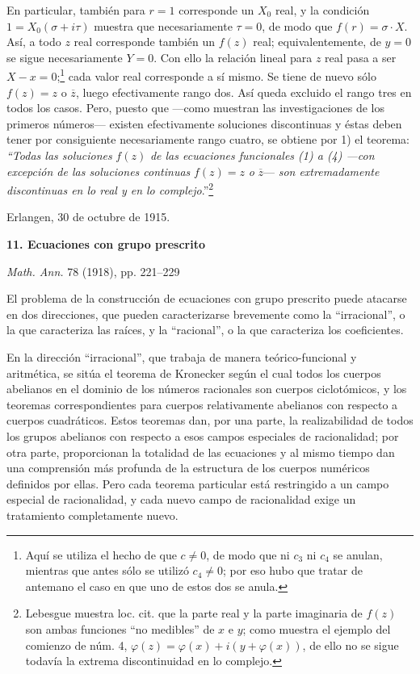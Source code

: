 \documentclass[11pt]{article}
\begin{document}
En particular, también para $r=1$ corresponde un $X_0$ real, y la condición $1=X_0(\sigma+i\tau)$ muestra que necesariamente $\tau=0$, de modo que $f(r)=\sigma\cdot X$. Así, a todo $z$ real corresponde también un $f(z)$ real; equivalentemente, de $y=0$ se sigue necesariamente $Y=0$. Con ello la relación lineal para $z$ real pasa a ser $X-x=0$;\footnote{Aquí se utiliza el hecho de que $c\ne0$, de modo que ni $c_3$ ni $c_4$ se anulan, mientras que antes sólo se utilizó $c_4\ne0$; por eso hubo que tratar de antemano el caso en que uno de estos dos se anula.} cada valor real corresponde a sí mismo. Se tiene de nuevo sólo $f(z)=z$ o $\overline z$, luego efectivamente rango dos. Así queda excluido el rango tres en todos los casos. Pero, puesto que ---como muestran las investigaciones de los primeros números--- existen efectivamente soluciones discontinuas y éstas deben tener por consiguiente necesariamente rango cuatro, se obtiene por 1) el teorema: \emph{``Todas las soluciones} $f(z)$ \emph{de las ecuaciones funcionales (1) a (4) ---con excepción de las soluciones continuas} $f(z)=z$ \emph{o} $\overline z$--- \emph{son extremadamente discontinuas en lo real y en lo complejo}.''\footnote{Lebesgue muestra loc. cit. que la parte real y la parte imaginaria de $f(z)$ son ambas funciones ``no medibles'' de $x$ e $y$; como muestra el ejemplo del comienzo de núm. 4, $\varphi(z)=\varphi(x)+i(y+\varphi(x))$, de ello no se sigue todavía la extrema discontinuidad en lo complejo.}

\medskip
\noindent Erlangen, 30 de octubre de 1915.

\newpage

\begin{center}
{\Large\bfseries 11. Ecuaciones con grupo prescrito}\par
\vspace{1.2em}
\emph{Math. Ann.} 78 (1918), pp. 221--229
\end{center}

\vspace{1.5em}

El problema de la construcción de ecuaciones con grupo prescrito puede atacarse en dos direcciones, que pueden caracterizarse brevemente como la ``irracional'', o la que caracteriza las raíces, y la ``racional'', o la que caracteriza los coeficientes.

En la dirección ``irracional'', que trabaja de manera teórico-funcional y aritmética, se sitúa el teorema de Kronecker según el cual todos los cuerpos abelianos en el dominio de los números racionales son cuerpos ciclotómicos, y los teoremas correspondientes para cuerpos relativamente abelianos con respecto a cuerpos cuadráticos. Estos teoremas dan, por una parte, la realizabilidad de todos los grupos abelianos con respecto a esos campos especiales de racionalidad; por otra parte, proporcionan la totalidad de las ecuaciones y al mismo tiempo dan una comprensión más profunda de la estructura de los cuerpos numéricos definidos por ellas. Pero cada teorema particular está restringido a un campo especial de racionalidad, y cada nuevo campo de racionalidad exige un tratamiento completamente nuevo.
\end{document}
